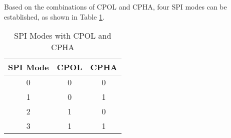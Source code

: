 \documentclass{article}
\begin{document}
Based on the combinations of CPOL and CPHA, four SPI modes can be established, as shown in Table \ref{tab:spi_modes}.

\begin{table}[h]
    \centering
    \caption{SPI Modes with CPOL and CPHA}
    \begin{tabular}{@{}ccc@{}}
        \toprule
        \textbf{SPI Mode} & \textbf{CPOL} & \textbf{CPHA} \\ \midrule
        0                  & 0             & 0             \\
        1                  & 0             & 1             \\
        2                  & 1             & 0             \\
        3                  & 1             & 1             \\ \bottomrule
    \end{tabular}
    \label{tab:spi_modes}
\end{table}





\end{document}
